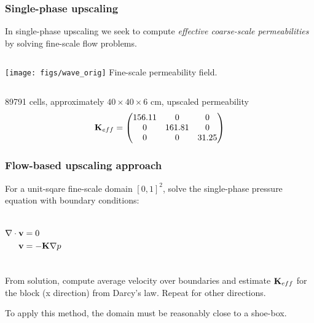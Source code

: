 \documentclass[UKenglish,10pt]{beamer}
\def\bfK{{\bf K}}
\def\bfv{{\bf v}}
\def\bfn{{\bf n}}
\begin{document}
\begin{frame}
  \frametitle{Single-phase upscaling}
  In single-phase upscaling we seek to compute \emph{effective
    coarse-scale permeabilities} by solving fine-scale flow problems.

  \begin{columns}[c]
    \texttt{[image: figs/wave\_orig]}
    Fine-scale permeability field.
  \end{columns}
  89791 cells, approximately $40 \times 40 \times 6$ cm, upscaled permeability
  \[
  \bfK_{eff} = 
  \begin{pmatrix}
    156.11 & 0 & 0 \\ 
    0 & 161.81 & 0 \\
    0 & 0 & 31.25 \\
  \end{pmatrix}
  \]
\end{frame}



\begin{frame}
  \frametitle{Flow-based upscaling approach}
  For a unit-sqare fine-scale domain $[0,1]^2$, solve the
  single-phase pressure equation with boundary conditions:

  \begin{columns}
    \begin{align*}
      \nabla\cdot\bfv  & = 0 \\
      \bfv & = -\bfK\nabla p \\
    \end{align*}
  \end{columns}
  \bigskip

  From solution, compute average velocity over boundaries and estimate
  $\bfK_{eff}$ for the block (x direction) from Darcy's law. Repeat for
  other directions.
  \bigskip

  To apply this method, the domain must be reasonably close to a shoe-box.
\end{frame}
\end{document}
